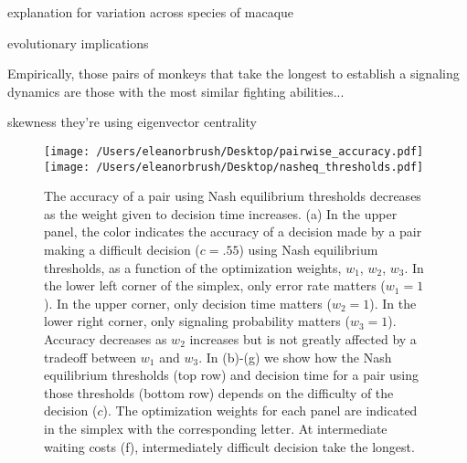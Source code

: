 \documentclass{article}
\begin{document}
explanation for variation across species of macaque

evolutionary implications

Empirically, those pairs of monkeys that take the longest to establish a signaling dynamics are those with the most similar fighting abilities...

skewness
they're using eigenvector centrality

\begin{figure}[ht]
\texttt{[image: /Users/eleanorbrush/Desktop/pairwise\_accuracy.pdf]}
\texttt{[image: /Users/eleanorbrush/Desktop/nasheq\_thresholds.pdf]}
\caption{\label{nasheq_thresholds}  The accuracy of a pair using Nash equilibrium thresholds decreases as the weight given to decision time increases.  (a) In the upper panel, the color indicates the accuracy of a decision made by a pair making a difficult decision ($c=.55$) using Nash equilibrium thresholds, as a function of the optimization weights, $w_1$, $w_2$, $w_3$.  In the lower left corner of the simplex, only error rate matters ($w_1=1$).  In the upper corner, only decision time matters ($w_2=1$).  In the lower right corner, only signaling probability matters ($w_3=1$). Accuracy decreases as $w_2$ increases but is not greatly affected by a tradeoff between $w_1$ and $w_3$. In (b)-(g) we show how the Nash equilibrium thresholds (top row) and decision time for a pair using those thresholds (bottom row) depends on the difficulty of the decision ($c$). The optimization weights for each panel are indicated in the simplex with the corresponding letter.  At intermediate waiting costs (f), intermediately difficult decision take the longest.}
\end{figure}
\end{document}
